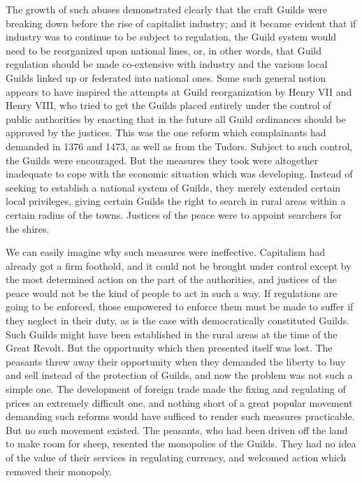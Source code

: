 \documentclass{book}
\begin{document}
The growth of such abuses demonstrated clearly that the craft Guilds were breaking down before the rise of capitalist industry; and it became evident that if industry was to continue to be subject to regulation, the Guild system would need to be reorganized upon national lines, or, in other words, that Guild regulation should be made co-extensive with industry and the various local Guilds linked up or federated into national ones. Some such general notion appears to have inspired the attempts at Guild reorganization by Henry VII and Henry VIII, who tried to get the Guilds placed entirely under the control of public authorities by enacting that in the future all Guild ordinances should be approved by the justices. This was the one reform which complainants had demanded in 1376 and 1473, as well as from the Tudors. Subject to such control, the Guilds were encouraged. But the measures they took were altogether inadequate to cope with the economic situation which was developing. Instead of seeking to establish a national system of Guilds, they merely extended certain local privileges, giving certain Guilds the right to search in rural areas within a certain radius of the towns. Justices of the peace were to appoint searchers for the shires.

We can easily imagine why such measures were ineffective. Capitalism had already got a firm foothold, and it could not be brought under control except by the most determined action on the part of the authorities, and justices of the peace would not be the kind of people to act in such a way. If regulations are going to be enforced, those empowered to enforce them must be made to suffer if they neglect in their duty, as is the case with democratically constituted Guilds. Such Guilds might have been established in the rural areas at the time of the Great Revolt. But the opportunity which then presented itself was lost. The peasants threw away their opportunity when they demanded the liberty to buy and sell instead of the protection of Guilds, and now the problem was not such a simple one. The development of foreign trade made the fixing and regulating of prices an extremely difficult one, and nothing short of a great popular movement demanding such reforms would have sufficed to render such measures practicable. But no such movement existed. The peasants, who had been driven off the land to make room for sheep, resented the monopolies of the Guilds. They had no idea of the value of their services in regulating currency, and welcomed action which removed their monopoly.
\end{document}
